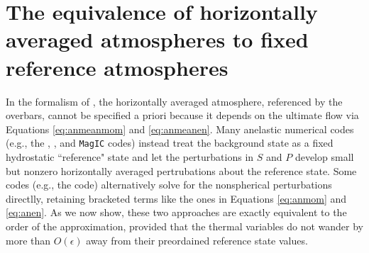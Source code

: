 \documentclass[12pt]{article}
\begin{document}
\section{The equivalence of horizontally averaged atmospheres to fixed reference atmospheres}
In the formalism of \citet{Gough1969}, the horizontally averaged atmosphere, referenced by the overbars, cannot be specified a priori because it depends on the ultimate flow via Equations \eqref{eq:anmeanmom} and \eqref{eq:anmeanen}. Many anelastic numerical codes (e.g., the {\rayleigh}, {\eulag}, and \texttt{MagIC} codes) instead treat the background state as a fixed hydrostatic ``reference" state and let the perturbations in $S$ and $P$ develop small but nonzero horizontally averaged pertrubations about the reference state. Some codes (e.g., the {\ash} code) alternatively solve for the nonspherical perturbations directlly, retaining bracketed terms like the ones in Equations \eqref{eq:anmom} and \eqref{eq:anen}. As we now show, these two approaches are exactly equivalent to the order of the approximation, provided that the thermal variables do not wander by more than $O(\epsilon)$ away from their preordained reference state values. 
\end{document}
